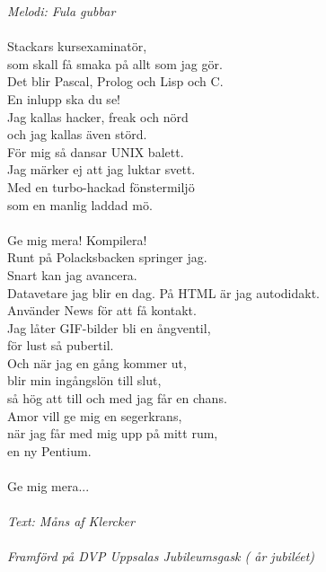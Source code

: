 {\footnotesize\textit{Melodi: Fula gubbar}}\\
\\
Stackars kursexaminatör,\\
som skall få smaka på allt som jag gör.\\
Det blir Pascal, Prolog och Lisp och C.\\
En inlupp ska du se!\\
Jag kallas hacker, freak och nörd\\
och jag kallas även störd.\\
För mig så dansar UNIX balett.\\
Jag märker ej att jag luktar svett.\\
Med en turbo-hackad fönstermiljö\\
som en manlig laddad mö.\\
\\
Ge mig mera! Kompilera!\\
Runt på Polacksbacken springer jag.\\
Snart kan jag avancera.\\
Datavetare jag blir en dag.
\newpage
På HTML är jag autodidakt.\\
Använder News för att få kontakt.\\
Jag låter GIF-bilder bli en ångventil,\\
för lust så pubertil.\\
Och när jag en gång kommer ut,\\
blir min ingångslön till slut,\\
så hög att till och med jag får en chans.\\
Amor vill ge mig en segerkrans,\\
när jag får med mig upp på mitt rum,\\
en ny Pentium.\\
\\
Ge mig mera...\\
\\
{\footnotesize\textit{Text: Måns af Klercker\\ \\ Framförd på DVP
      Uppsalas Jubileumsgask ( år jubiléet)}}
